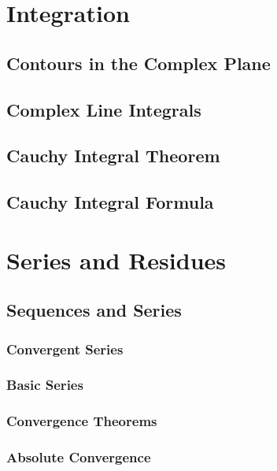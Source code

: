 \newpage
\section{Integration}

\subsection{Contours in the Complex Plane}

\subsection{Complex Line Integrals}

\subsection{Cauchy Integral Theorem}

\subsection{Cauchy Integral Formula}


\newpage
\section{Series and Residues}

\subsection{Sequences and Series}

\subsubsection{Convergent Series}

\subsubsection{Basic Series}

\subsubsection{Convergence Theorems}

\subsubsection{Absolute Convergence}

